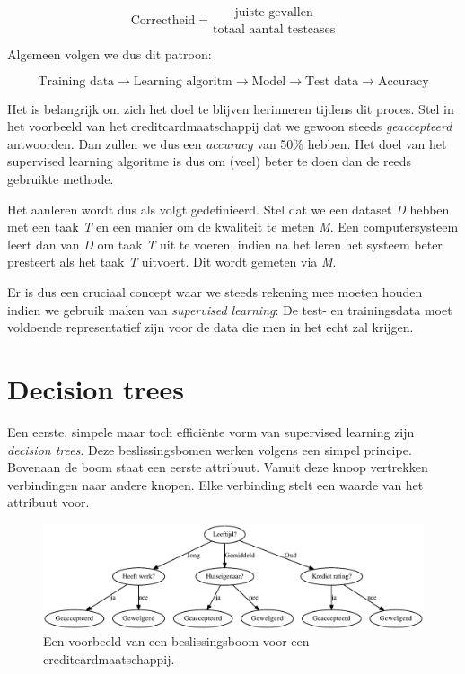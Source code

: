 \begin{equation}
\textrm{Correctheid} = \frac{\textrm{juiste gevallen}}{\textrm{totaal aantal testcases}}
\end{equation}

Algemeen volgen we dus dit patroon:

\begin{equation}
\textrm{Training data} \rightarrow \textrm{Learning  algoritm} \rightarrow \textrm{Model} \rightarrow \textrm{Test data} \rightarrow \textrm{Accuracy}
\end{equation}

Het is belangrijk om zich het doel te blijven herinneren tijdens dit proces. Stel in het voorbeeld van het creditcardmaatschappij dat we gewoon steeds \emph{geaccepteerd}  antwoorden. Dan zullen we dus een \emph{accuracy} van 50\% hebben. Het doel van het supervised learning algoritme is dus om (veel) beter te doen dan de reeds gebruikte methode.

Het aanleren wordt dus als volgt gedefinieerd. Stel dat we een dataset \emph{D} hebben met een taak \emph{T} en een manier om de kwaliteit te meten \emph{M}. Een computersysteem leert dan van \emph{D} om taak \emph{T} uit te voeren, indien na het leren het systeem beter presteert als het taak \emph{T} uitvoert. Dit wordt gemeten via \emph{M}.

Er is dus een cruciaal concept waar we steeds rekening mee moeten houden indien we gebruik maken van \emph{supervised learning}: De test- en trainingsdata moet voldoende representatief zijn voor de data die men in het echt zal krijgen.
\section{Decision trees}
Een eerste, simpele maar toch effici\"ente vorm van supervised learning zijn \emph{decision trees}. Deze beslissingsbomen werken volgens een simpel principe. Bovenaan de boom staat een eerste attribuut. Vanuit deze knoop vertrekken verbindingen naar andere knopen. Elke verbinding stelt een waarde van het attribuut voor.

\begin{figure}[h]
\includegraphics[width=\textwidth]{res/1}
\caption{Een voorbeeld van een beslissingsboom voor een creditcardmaatschappij.}
\label{fig:vb1_dt}
\end{figure}

